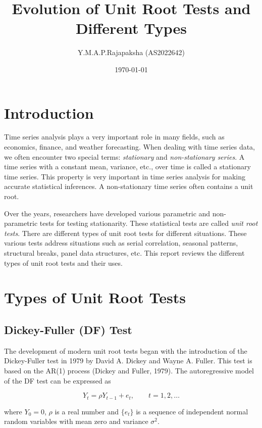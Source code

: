 \documentclass[12pt]{article}
\title{Evolution of Unit Root Tests and Different Types}
\author{Y.M.A.P.Rajapaksha (AS2022642)}
\date{\today}
\begin{document}
	
	\maketitle
	
	\section{Introduction}
	
	Time series analysis plays a very important role in many fields, such as economics, finance, and weather forecasting. When dealing with time series data, we often encounter two special terms: \textit{stationary} and \textit{non-stationary series}. A time series with a constant mean, variance, etc., over time is called a stationary time series. This property is very important in time series analysis for making accurate statistical inferences. A non-stationary time series often contains a unit root.
	
	\vspace{0.75cm}
	
	Over the years, researchers have developed various parametric and non-parametric tests for testing stationarity. These statistical tests are called \textit{unit root tests}. There are different types of unit root tests for different situations. These various tests address situations such as serial correlation, seasonal patterns, structural breaks, panel data structures, etc. This report reviews the different types of unit root tests and their uses.
	

	
	\section{Types of Unit Root Tests}
	
	\subsection{Dickey-Fuller (DF) Test}
	
	The development of modern unit root tests began with the introduction of the Dickey-Fuller test in 1979 by David A. Dickey and Wayne A. Fuller. This test is based on the AR(1) process (Dickey and Fuller, 1979). The autoregressive model of the DF test can be expressed as
	
	\[
	Y_t = \rho Y_{t-1} + e_t, \qquad t = 1,2,\ldots
	\]
	
	
	\noindent where \(Y_0 = 0\), \(\rho\) is a real number and \(\{e_t\}\) is a sequence of independent normal random variables with mean zero and variance \(\sigma^2\).
	
\end{document}
